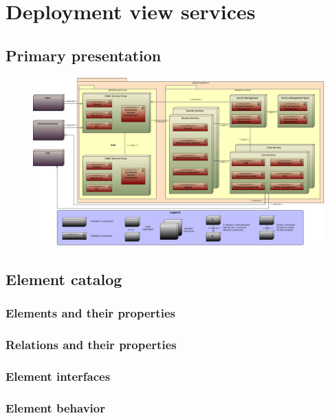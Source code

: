 \documentclass[a4paper,10pt]{paper}
\begin{document}
\section{Deployment view services}

\subsection{Primary presentation}
\begin{center}
    \begin{figure}
      \includegraphics[width=\textwidth]{../images/deployment_services.jpg}
    \end{figure}
  \end{center}

\subsection{Element catalog}

\subsubsection{Elements and their properties}

\subsubsection{Relations and their properties}

\subsubsection{Element interfaces}

\subsubsection{Element behavior}
\end{document}
